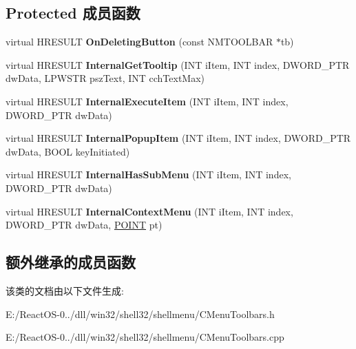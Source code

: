 \subsection*{Protected 成员函数}
\begin{DoxyCompactItemize}
\item 
\mbox{\label{class_c_menu_s_f_toolbar_a8fa101bb5209a0b9455d11db20bb7e1c}} 
virtual H\+R\+E\+S\+U\+LT {\bfseries On\+Deleting\+Button} (const N\+M\+T\+O\+O\+L\+B\+AR $\ast$tb)
\item 
\mbox{\label{class_c_menu_s_f_toolbar_a3e45d9ce069b27551b0929c257f4ff26}} 
virtual H\+R\+E\+S\+U\+LT {\bfseries Internal\+Get\+Tooltip} (I\+NT i\+Item, I\+NT index, D\+W\+O\+R\+D\+\_\+\+P\+TR dw\+Data, L\+P\+W\+S\+TR psz\+Text, I\+NT cch\+Text\+Max)
\item 
\mbox{\label{class_c_menu_s_f_toolbar_a027de7aac867f39e392a04b6a84f2cf0}} 
virtual H\+R\+E\+S\+U\+LT {\bfseries Internal\+Execute\+Item} (I\+NT i\+Item, I\+NT index, D\+W\+O\+R\+D\+\_\+\+P\+TR dw\+Data)
\item 
\mbox{\label{class_c_menu_s_f_toolbar_abece7aa3acf9449bea986651cf64abb0}} 
virtual H\+R\+E\+S\+U\+LT {\bfseries Internal\+Popup\+Item} (I\+NT i\+Item, I\+NT index, D\+W\+O\+R\+D\+\_\+\+P\+TR dw\+Data, B\+O\+OL key\+Initiated)
\item 
\mbox{\label{class_c_menu_s_f_toolbar_abb9e74a22e7d11b453eb9fb2bdff33c8}} 
virtual H\+R\+E\+S\+U\+LT {\bfseries Internal\+Has\+Sub\+Menu} (I\+NT i\+Item, I\+NT index, D\+W\+O\+R\+D\+\_\+\+P\+TR dw\+Data)
\item 
\mbox{\label{class_c_menu_s_f_toolbar_a251cd68fae67c0d81139180656ef589a}} 
virtual H\+R\+E\+S\+U\+LT {\bfseries Internal\+Context\+Menu} (I\+NT i\+Item, I\+NT index, D\+W\+O\+R\+D\+\_\+\+P\+TR dw\+Data, \hyperlink{structtag_p_o_i_n_t}{P\+O\+I\+NT} pt)
\end{DoxyCompactItemize}
\subsection*{额外继承的成员函数}


该类的文档由以下文件生成\+:\begin{DoxyCompactItemize}
\item 
E\+:/\+React\+O\+S-\/0../dll/win32/shell32/shellmenu/C\+Menu\+Toolbars.\+h\item 
E\+:/\+React\+O\+S-\/0../dll/win32/shell32/shellmenu/C\+Menu\+Toolbars.\+cpp\end{DoxyCompactItemize}
